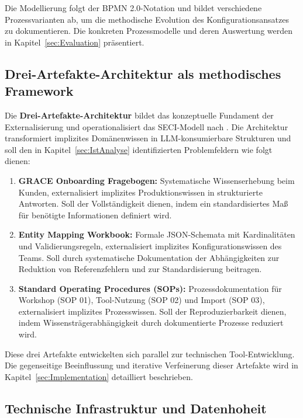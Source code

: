 \noindent Die Modellierung folgt der BPMN 2.0-Notation und bildet verschiedene Prozessvarianten ab, um die methodische Evolution des Konfigurationsansatzes zu dokumentieren. Die konkreten Prozessmodelle und deren Auswertung werden in Kapitel~\ref{sec:Evaluation} präsentiert.


\subsection{Drei-Artefakte-Architektur als methodisches Framework}
\label{subsec:DreiArtefakteArchitektur}

Die \textbf{Drei-Artefakte-Architektur} bildet das konzeptuelle Fundament der Externalisierung und operationalisiert das SECI-Modell nach \cite{nonaka:knowledge_creating_company1995}. Die Architektur transformiert implizites Domänenwissen in LLM-konsumierbare Strukturen und soll den in Kapitel~\ref{sec:IstAnalyse} identifizierten Problemfeldern wie folgt dienen:

\begin{enumerate}
    \item \textbf{GRACE Onboarding Fragebogen:} Systematische Wissenserhebung beim Kunden, externalisiert implizites Produktionswissen in strukturierte Antworten. Soll der Vollständigkeit dienen, indem ein standardisiertes Maß für benötigte Informationen definiert wird.

    \item \textbf{Entity Mapping Workbook:} Formale JSON-Schemata mit Kardinalitäten und Validierungsregeln, externalisiert implizites Konfigurationswissen des Teams. Soll durch systematische Dokumentation der Abhängigkeiten zur Reduktion von Referenzfehlern und zur Standardisierung beitragen.

    \item \textbf{Standard Operating Procedures (SOPs):} Prozessdokumentation für Workshop (SOP 01), Tool-Nutzung (SOP 02) und Import (SOP 03), externalisiert implizites Prozesswissen. Soll der Reproduzierbarkeit dienen, indem Wissensträgerabhängigkeit durch dokumentierte Prozesse reduziert wird.
\end{enumerate}

\noindent Diese drei Artefakte entwickelten sich parallel zur technischen Tool-Entwicklung. Die gegenseitige Beeinflussung und iterative Verfeinerung dieser Artefakte wird in Kapitel~\ref{sec:Implementation} detailliert beschrieben.


\subsection{Technische Infrastruktur und Datenhoheit}
\label{subsec:TechnischeInfrastruktur}


